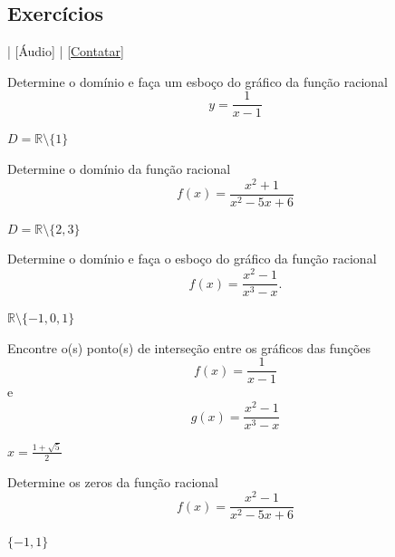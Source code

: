 \subsection*{Exercícios}

\begin{flushright}
  [Vídeo] | [Áudio] | \href{https://phkonzen.github.io/notas/contato.html}{[Contatar]}
\end{flushright}

\begin{exer}
  Determine o domínio e faça um esboço do gráfico da função racional
  \begin{equation}
    y = \frac{1}{x-1}
  \end{equation}
\end{exer}
\begin{resp}
  $D=\mathbb{R}\setminus\{1\}$
\end{resp}

\begin{exer}
  Determine o domínio da função racional
  \begin{equation}
    f(x) = \frac{x^2+1}{x^2-5x+6}
  \end{equation}
\end{exer}
\begin{resp}
  $D=\mathbb{R}\setminus\{2,3\}$
\end{resp}

\begin{exer}
  Determine o domínio e faça o esboço do gráfico da função racional
  \begin{equation}
    f(x) = \frac{x^2-1}{x^3-x}.
  \end{equation}
\end{exer}
\begin{resp}
  $\mathbb{R}\setminus\{-1,0,1\}$
\end{resp}

\begin{exer}
  Encontre o(s) ponto(s) de interseção entre os gráficos das funções
  \begin{equation}
    f(x) = \frac{1}{x-1}
  \end{equation}
  e
  \begin{equation}
    g(x) = \frac{x^2-1}{x^3-x}
  \end{equation}
\end{exer}
\begin{resp}
  $x=\frac{1 + \sqrt{5}}{2}$
\end{resp}

\begin{exer}
  Determine os zeros da função racional
  \begin{equation}
    f(x) = \frac{x^2-1}{x^2-5x+6}
  \end{equation}
\end{exer}
\begin{resp}
  $\{-1,1\}$
\end{resp}


